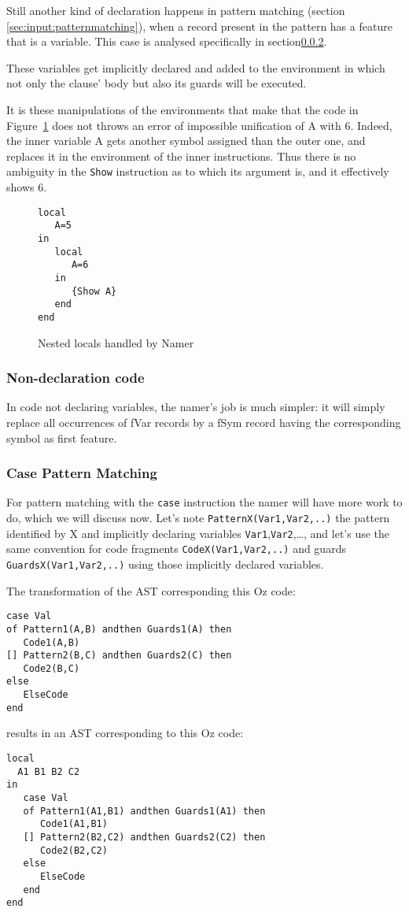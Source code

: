 \documentclass[a4paper]{memoir}
\begin{document}
Still another kind of declaration happens in pattern matching (section \ref{sec:input:patternmatching}), when a record present in the pattern has a feature that is a variable. This case is analysed specifically in section\ref{sec:arch:namer:patternmatching}.

These variables get implicitly declared and added to the environment in which not only the clause' body but also its guards will be executed.


It is these manipulations of the environments that make that the code in Figure~\ref{fig:namer_nested_locals} does not throws an error of impossible unification of A with 6. Indeed, the inner variable A gets another symbol assigned than the outer one, and replaces it in the environment of the inner instructions. Thus there is no ambiguity in the \lstinline!Show! instruction as to which its argument is, and it effectively shows 6.
\begin{figure}
\begin{lstlisting}
local
   A=5
in
   local 
      A=6
   in
      {Show A}
   end
end
\end{lstlisting}
\caption{Nested locals handled by Namer}
\label{fig:namer_nested_locals}
\end{figure}


\subsubsection{Non-declaration code}
In code not declaring variables, the namer's job is much simpler: it will simply
replace all occurrences of fVar records by a fSym record having the corresponding symbol as first feature.
\subsubsection{Case Pattern Matching}\label{sec:arch:namer:patternmatching}
For pattern matching with the \lstinline!case! instruction the namer will have
more work to do, which we will discuss now. Let's note
\lstinline!PatternX(Var1,Var2,..)! the pattern identified by X and implicitly
declaring variables \lstinline!Var1!,\lstinline!Var2!,\ldots, and let's use the same convention for code fragments \lstinline!CodeX(Var1,Var2,..)! and guards \lstinline!GuardsX(Var1,Var2,..)! using those implicitly declared variables.

The transformation of the AST corresponding this Oz code:
\begin{lstlisting}
case Val
of Pattern1(A,B) andthen Guards1(A) then
   Code1(A,B)
[] Pattern2(B,C) andthen Guards2(C) then
   Code2(B,C)
else
   ElseCode
end
\end{lstlisting}
results in an AST corresponding to this Oz code:
\begin{lstlisting}
local
  A1 B1 B2 C2
in
   case Val
   of Pattern1(A1,B1) andthen Guards1(A1) then
      Code1(A1,B1)
   [] Pattern2(B2,C2) andthen Guards2(C2) then
      Code2(B2,C2)
   else
      ElseCode
   end
end
\end{lstlisting}
\end{document}
